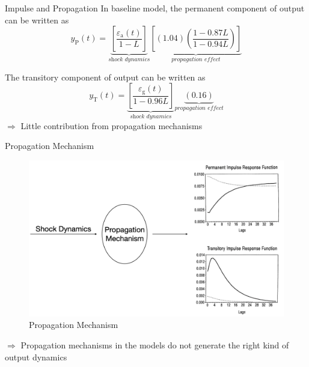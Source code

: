 \documentclass[10pt]{beamer}
\begin{document}
\begin{frame}{Impulse and Propagation}
    In baseline model, the permanent component of output can be written as
    $$
        y_{\mathrm{P}}(t)=\underbrace{\left[\frac{\varepsilon_{\mathrm{a}}(t)}{1-L}\right]}_{\textit{shock dynamics}}\underbrace{\left[(1.04)\left(\frac{1-0.87 L}{1-0.94 L}\right)\right]}_{\textit{propagation effect}}
    $$

    The transitory component of output can be written as $$
        y_{\mathrm{T}}(t)=\underbrace{\left[\frac{\varepsilon_{\mathrm{g}}(t)}{1-0.96
                    L}\right]}_{\textit{shock dynamics}}\underbrace{(0.16)}_{\textit{propagation
            effect}} $$ $\Rightarrow$ Little contribution from propagation mechanisms

\end{frame}

\begin{frame}{Propagation Mechanism}
    \begin{figure}
        \centering
        \includegraphics[width=0.8\linewidth]{figures/propagation0.png}
        \caption{Propagation Mechanism}
    \end{figure}

    $\Rightarrow$ Propagation mechanisms in the models do not generate the right kind of output dynamics
\end{frame}
\end{document}
